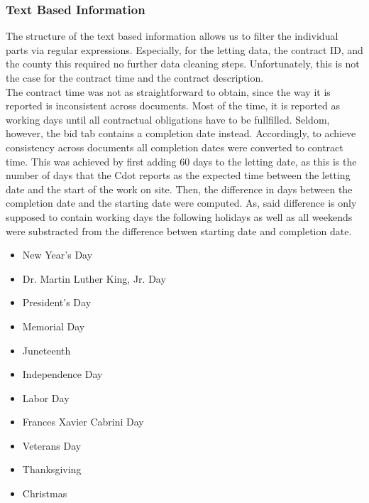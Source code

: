 \documentclass[a4paper,12pt, headsepline]{scrartcl}
\numberwithin{equation}{section}
\begin{document}
\subsubsection{Text Based Information}\label{subsubsec:descr}
 The structure of the text based information allows us to filter the individual parts via regular expressions. Especially, for the letting data, the contract ID, and the county this required no further data cleaning steps. Unfortunately, this is not the case for the contract time and the contract description.\\ 
 The contract time was not as straightforward to obtain, since the way it is reported is inconsistent across documents. Most of the time, it is reported as working days until all contractual obligations have to be fullfilled. Seldom, however, the bid tab contains a completion date instead. Accordingly, to achieve consistency across documents all completion dates were converted to contract time. This was achieved by first adding 60 days to the letting date, as this is the number of days that the Cdot reports as the expected time between the letting date and the start of the work on site. Then, the difference in days between the completion date and the starting date were computed. As, said difference is only supposed to contain working days the following holidays as well as all weekends were substracted from the difference betwen starting date and completion date.
 
 \begin{itemize}
 	\item New Year's Day
 	\item Dr. Martin Luther King, Jr. Day
 	\item President's Day
 	\item Memorial Day
 	\item Juneteenth
 	\item Independence Day
 	\item Labor Day
 	\item Frances Xavier Cabrini Day
 	\item Veterans Day
 	\item Thanksgiving
 	\item Christmas
 \end{itemize}
 
\end{document}
